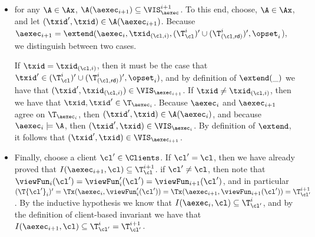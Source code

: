 \begin{itemize}
\item for any $\A \in \Ax$, $\A(\aexec_{i+1}) \subseteq \VIS_{\aexec}^{i+1}$. 
To this end, choose, $\A \in \Ax$, and let $(\txid', \txid) \in \A(\aexec_{i+1})$. 
Because $\aexec_{i+1} = \extend(\aexec_{i}, \txid_{(\cl, i)}, (\T_{\cl}^{i})' \cup (\T_{(\cl, \mathsf{rd})}^{i})', \opset_{i}$), 
we distinguish between two cases.

If $\txid = \txid_{(\cl, i)}$, then it must be the case that $\txid' \in (\T^{i}_{\cl})' \cup (\T_{(\cl, \mathsf{rd})}^{i})', \opset_{i})$, 
and by definition of $\extend(\_)$ we have that $(\txid' ,\txid_{(\cl, i)}) \in \VIS_{\aexec_{i+1}}$. 
If $\txid \neq \txid_{(\cl, i)}$, then we have that $\txid, \txid' \in \T_{\aexec_{i}}$. Because 
$\aexec_{i}$ and $\aexec_{i+1}$ agree on $\T_{\aexec_{i}}$, then $(\txid', \txid) \in \A(\aexec_{i})$, 
and because $\aexec_{i} \models \A$, then $(\txid', \txid) \in \VIS_{\aexec_{i}}$. By definition of 
$\extend$, it follows that $(\txid', \txid) \in \VIS_{\aexec_{i+1}}$.

\item Finally, choose a client $\cl' \in \Clients$. If $\cl' = \cl$, then we have already proved that 
$I(\aexec_{i+1}, \cl) \subseteq \T_{\cl}^{i+1}$. 
if $\cl' \neq \cl$, then note that $\viewFun_{i}(\cl') = \viewFun'_{i}(\cl') = \viewFun_{i+1}(\cl')$, 
and in particular $(\T{\cl'}_{i})' = \Tx(\aexec_{i}, \viewFun'_{i}(\cl')) = \Tx(\aexec_{i+1}, \viewFun_{i+1}(\cl')) =  \T_{\cl'}^{i+1}$.
By the inductive hypothesis we know that $I(\aexec_{i}, \cl) \subseteq \T_{\cl'}^{i}$, 
and by the definition of client-based invariant we have that $I(\aexec_{i+1}, \cl) \subseteq \T_{\cl'}^{i} = \T_{\cl'}^{i+1}$. 
\end{itemize}
